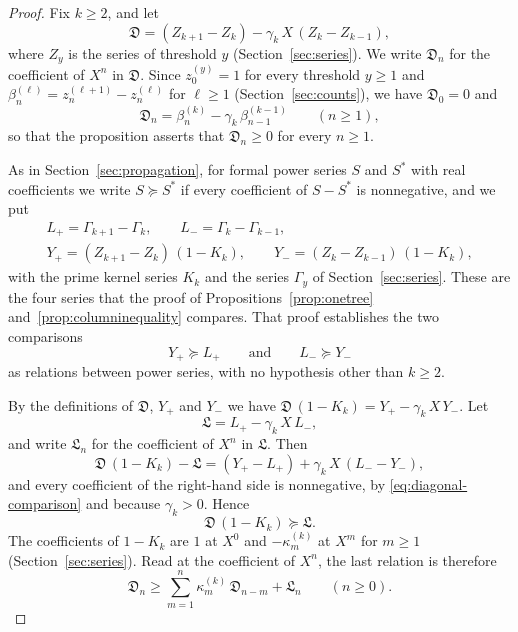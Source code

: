 \documentclass{amsart}
\theoremstyle{definition}
\theoremstyle{remark}
\numberwithin{equation}{section}
\begin{document}
\begin{proof}
Fix $k\ge2$, and let
\[
\mathfrak D=(Z_{k+1}-Z_k)-\gamma_k\,X\,(Z_k-Z_{k-1}),
\]
where $Z_y$ is the series of threshold $y$ (Section~\ref{sec:series}). We
write $\mathfrak D_n$ for the coefficient of $X^n$ in $\mathfrak D$. Since
$z^{(y)}_0=1$ for every threshold $y\ge1$ and
$\beta^{(\ell)}_n=z^{(\ell+1)}_n-z^{(\ell)}_n$ for $\ell\ge1$
(Section~\ref{sec:counts}), we have $\mathfrak D_0=0$ and
\[
\mathfrak D_n=\beta^{(k)}_n-\gamma_k\,\beta^{(k-1)}_{n-1}\qquad(n\ge1),
\]
so that the proposition asserts that $\mathfrak D_n\ge0$ for every $n\ge1$.

As in Section~\ref{sec:propagation}, for formal power series $S$ and $S^{*}$
with real coefficients we write $S\succeq S^{*}$ if every coefficient of
$S-S^{*}$ is nonnegative, and we put
\begin{gather*}
L_{+}=\Gamma_{k+1}-\Gamma_k,\qquad L_{-}=\Gamma_k-\Gamma_{k-1},\\
Y_{+}=(Z_{k+1}-Z_k)\,(1-K_k),\qquad Y_{-}=(Z_k-Z_{k-1})\,(1-K_k),
\end{gather*}
with the prime kernel series $K_k$ and the series $\Gamma_y$ of
Section~\ref{sec:series}. These are the four series that the proof of
Propositions~\ref{prop:onetree} and~\ref{prop:columninequality} compares.
That proof establishes the two comparisons
\begin{equation}\label{eq:diagonal-comparison}
Y_{+}\succeq L_{+}\qquad\text{and}\qquad L_{-}\succeq Y_{-}
\end{equation}
as relations between power series, with no hypothesis other than $k\ge2$.

By the definitions of $\mathfrak D$, $Y_{+}$ and $Y_{-}$ we have
$\mathfrak D\,(1-K_k)=Y_{+}-\gamma_k\,X\,Y_{-}$. Let
\[
\mathfrak L=L_{+}-\gamma_k\,X\,L_{-},
\]
and write $\mathfrak L_n$ for the coefficient of $X^n$ in $\mathfrak L$. Then
\[
\mathfrak D\,(1-K_k)-\mathfrak L
=(Y_{+}-L_{+})+\gamma_k\,X\,(L_{-}-Y_{-}),
\]
and every coefficient of the right-hand side is nonnegative, by
\eqref{eq:diagonal-comparison} and because $\gamma_k>0$. Hence
\[
\mathfrak D\,(1-K_k)\succeq\mathfrak L .
\]
The coefficients of $1-K_k$ are $1$ at $X^0$ and $-\kappa^{(k)}_m$ at $X^m$
for $m\ge1$ (Section~\ref{sec:series}). Read at the coefficient of $X^n$, the
last relation is therefore
\begin{equation}\label{eq:diagonal-renewal}
\mathfrak D_n\ge\sum_{m=1}^{n}\kappa^{(k)}_m\,\mathfrak D_{n-m}+\mathfrak L_n
\qquad(n\ge0).
\end{equation}


\end{proof}
\end{document}
